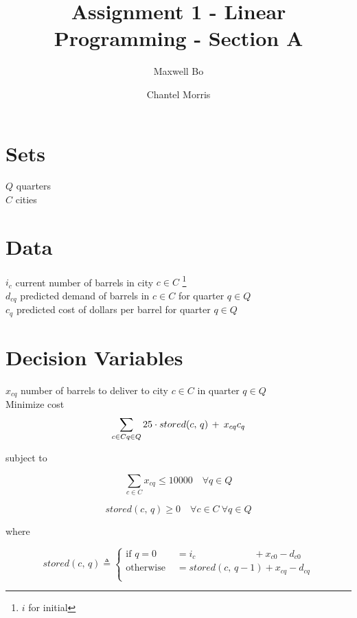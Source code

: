 \documentclass[a4paper]{article}
\title{Assignment 1 - Linear Programming - Section A}
\author{Maxwell Bo  \and Chantel Morris}
\begin{document}
 

\maketitle

\section*{Sets}

$Q$ quarters\\
$C$ cities\\

\section*{Data}

$i_c$ current number of barrels in city $c \in C$ \footnote{$i$ for initial}\\
$d_{cq}$ predicted demand of barrels in $c \in C$ for quarter $q \in Q$\\
$c_q$ predicted cost of dollars per barrel for quarter $q \in Q$\\

\section*{Decision Variables}

$x_{cq}$ number of barrels to deliver to city $c \in C$ in quarter $q \in Q$\\

Minimize cost
\[
\sum_{c \in C\\ q \in Q} 25 \cdot stored(c,\, q)\, +\: x_{cq} c_q
\]

subject to

\[
\sum_{c \in C} x_{cq} \leq 10000 \quad \forall q \in Q
\]


\[
stored(c,\, q) \geq 0 \quad \forall c \in C\ \forall q \in Q 
\]

where

\[
stored(c,\, q) \triangleq \begin{cases}
    \text{if }  q = 0 & = i_{c} \quad \qquad \qquad \quad +  x_{c0} - d_{c0}\\
    \text{otherwise } & = stored(c,\, q - 1) + x_{cq} - d_{cq}\\
\end{cases}
\]
\end{document}
